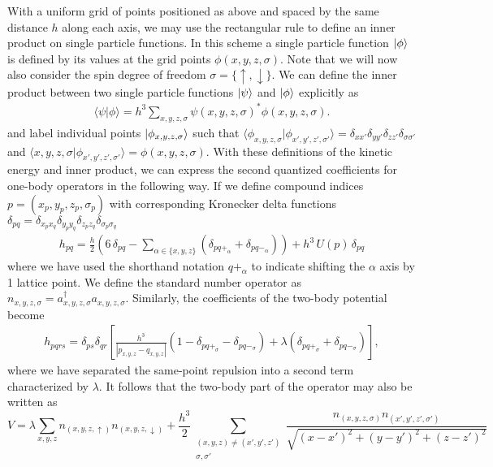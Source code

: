 \documentclass[superscriptaddress,aps,pra,nofootinbib,notitlepage,10pt,longbibliography]{revtex4-1}
\def\ket#1{\mathinner{|{#1}\rangle}}
\newcommand{\braket}[2]{\langle #1|#2\rangle}
\begin{document}
With a uniform grid of points positioned as above and spaced by the same distance $h$ along each axis, we may use the rectangular rule to define an inner product on single particle functions.  In this scheme a single particle function $\ket{\phi}$ is defined by its values at the grid points $\phi(x, y, z, \sigma)$. Note that we will now also consider the spin degree of freedom $\sigma = \{\uparrow, \downarrow\}$. We can define the inner product between two single particle functions $\ket{\psi}$ and $\ket{\phi}$ explicitly as
\begin{align}
\braket{\psi}{\phi} = h^3 \sum_{x, y, z, \sigma} \psi(x, y, z, \sigma)^* \phi(x, y, z, \sigma).
\end{align}
and label individual points $\ket{\phi_{x,y,z,\sigma}}$ such that $\braket{\phi_{x,y,z,\sigma}}{\phi_{x',y',z',\sigma'}} = \delta_{x x'} \delta_{y y'} \delta_{z z'} \delta_{\sigma \sigma'}$ and $\braket{x,y,z,\sigma}{\phi_{x',y',z',\sigma'}} = \phi(x, y, z, \sigma)$. With these definitions of the kinetic energy and inner product, we can express the second quantized coefficients for one-body operators in the following way. If we define compound indices $p=(x_p,y_p,z_p,\sigma_p)$ with corresponding Kronecker delta functions $\delta_{pq} = \delta_{x_p x_q} \delta_{y_p y_q} \delta_{z_p z_q} \delta_{\sigma_p \sigma_q}$
\begin{align}
h_{pq} = \frac{h}{2}\left(6 \, \delta_{pq} - \sum_{\alpha \in \{x, y, z\}} \left( \delta_{pq+_\alpha} + \delta_{pq-_\alpha} \right) \right) + h^3 \, U(p) \, \delta_{pq}
\end{align}
where we have used the shorthand notation $q+_\alpha$ to indicate shifting the $\alpha$ axis by 1 lattice point.
We define the standard number operator as $n_{x,y,z,\sigma}= a_{x,y,z,\sigma}^\dagger a_{x,y,z,\sigma}$. Similarly, the coefficients of the two-body potential become
\begin{align}
h_{pqrs} = \delta_{ps} \delta_{qr} \left[\frac{h^3}{|p_{x,y,z} - q_{x,y,z}|}(1 - \delta_{pq+_\sigma} - \delta_{pq-_\sigma}) + \lambda (\delta_{pq+_\sigma} + \delta_{pq-_\sigma}) \right],
\end{align}
where we have separated the same-point repulsion into a second term characterized by $\lambda$.  It follows that the two-body part of the operator may also be written as
\begin{equation}
V = \lambda \sum_{x,y,z} n_{(x,y,z, \uparrow)} n_{(x,y,z, \downarrow)}
%
+ \frac{h^3}{2}\sum_{\substack{(x, y, z) \neq (x', y', z') \\ \sigma, \sigma'}} \frac{n_{(x,y,z,\sigma)} n_{(x',y',z',\sigma')}}{\sqrt{(x - x')^2 + (y - y')^2 + (z - z')^2 }}
\end{equation}
\end{document}
